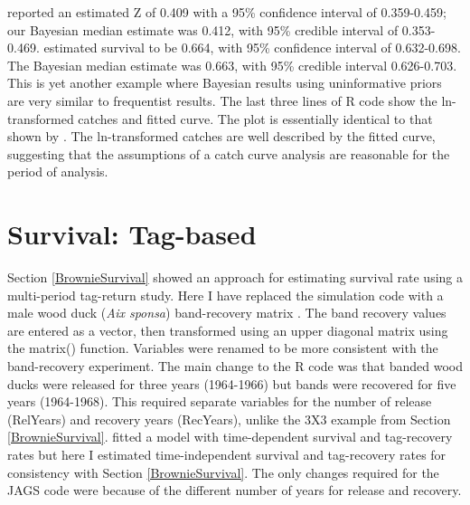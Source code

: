 \documentclass[
]{krantz}
\begin{document}
\citet{quinn.deriso_1999} reported an estimated Z of 0.409 with a 95\% confidence interval of 0.359-0.459; our Bayesian median estimate was 0.412, with 95\% credible interval of 0.353-0.469. \citet{quinn.deriso_1999} estimated survival to be 0.664, with 95\% confidence interval of 0.632-0.698. The Bayesian median estimate was 0.663, with 95\% credible interval 0.626-0.703. This is yet another example where Bayesian results using uninformative priors are very similar to frequentist results. The last three lines of R code show the ln-transformed catches and fitted curve. The plot is essentially identical to that shown by \citet{quinn.deriso_1999}. The ln-transformed catches are well described by the fitted curve, suggesting that the assumptions of a catch curve analysis are reasonable for the period of analysis.

\hypertarget{BrownieSurvivalRealData}{%
\section{Survival: Tag-based}\label{BrownieSurvivalRealData}}

Section \ref{BrownieSurvival} showed an approach for estimating survival rate using a multi-period tag-return study. Here I have replaced the simulation code with a male wood duck (\emph{Aix sponsa}) band-recovery matrix \citep[Table 2.2,][]{brownie.etal1985}. The band recovery values are entered as a vector, then transformed using an upper diagonal matrix using the matrix() function. Variables were renamed to be more consistent with the band-recovery experiment. The main change to the R code was that banded wood ducks were released for three years (1964-1966) but bands were recovered for five years (1964-1968). This required separate variables for the number of release (RelYears) and recovery years (RecYears), unlike the 3X3 example from Section \ref{BrownieSurvival}. \citet{brownie.etal1985} fitted a model with time-dependent survival and tag-recovery rates but here I estimated time-independent survival and tag-recovery rates for consistency with Section \ref{BrownieSurvival}. The only changes required for the JAGS code were because of the different number of years for release and recovery.
\end{document}
